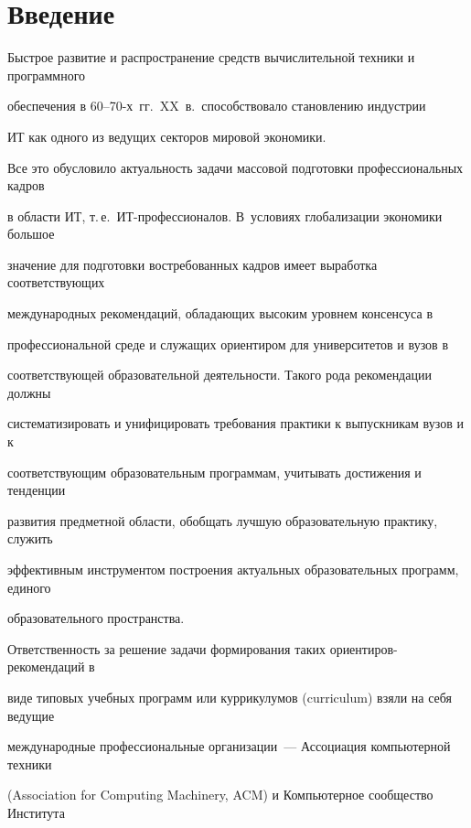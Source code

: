       

            \label{st\stat}

            




\section{Введение }



Быстрое развитие и распространение средств вычислительной техники и программного 

обеспечения в 60--70-х~гг.\ XX~в.\ способствовало становлению индустрии 

ИТ как одного из ведущих секторов мировой экономики. 

Все это обусловило актуальность задачи массовой подготовки профессиональных кадров 

в области ИТ, т.\,е.\ ИТ-профессионалов. В~условиях глобализации экономики большое 

значение для подготовки востребованных кадров имеет выработка соответствующих 

международных рекомендаций, обладающих высоким уровнем консенсуса в 

профессиональной среде и служащих ориентиром для университетов и вузов в 

соответствующей образовательной деятельности. Такого рода рекомендации должны 

систематизировать и унифицировать требования практики к выпускникам вузов и к 

соответствующим образовательным программам, учитывать достижения и тенденции 

развития предметной области, обобщать лучшую образовательную практику, служить 

эффективным инструментом построения актуальных образовательных программ, единого 

образовательного пространства.



Ответственность за решение задачи формирования таких ориентиров-рекомендаций в 

виде типовых учебных программ или куррикулумов (curriculum) взяли на себя ведущие 

международные профессиональные организации~--- Ассоциация компьютерной техники 

(Association for Computing Machinery, ACM) и Компьютерное сообщество Института 

